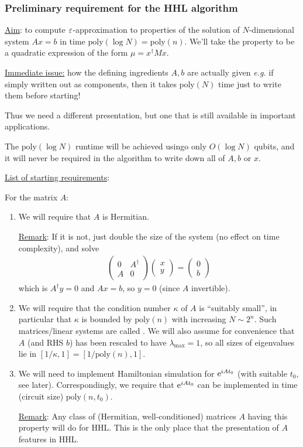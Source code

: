\documentclass[]{article}
\renewcommand{\it}[1]{\textit{#1}}
\newcommand{\poly}{\textrm{poly}}
\begin{document}
\subsubsection*{Preliminary requirement for the HHL algorithm}

\underline{Aim}: to compute $\varepsilon$-approximation to properties of the solution of $N$-dimensional system $Ax = b$ in time $\poly(\log N) = \poly(n)$. We'll take the property to be a quadratic expression of the form $\mu = x^\dagger M x$.

\underline{Immediate issue:} how the defining ingredients $A,b$ are actually given \it{e.g.} if simply written out as components, then it takes $\poly(N)$ time just to write them before starting!

Thus we need a different presentation, but one that is still available in important applications.

The $\poly(\log N)$ runtime will be achieved usingo only $O(\log N)$ qubits, and it will never be required in the algorithm to write down all of $A,b$ or $x$.

\underline{List of starting requirements}:

For the matrix $A$:

\begin{enumerate}
	\item We will require that $A$ is Hermitian.
	
	\underline{Remark}: If it is not, just double the size of the system (no effect on time complexity), and solve
	\begin{align*}
		\left( \begin{array}{cc} 0 & A^\dagger \\ A & 0 \end{array}\right)\left(\begin{array}{c} x \\ y \end{array}\right) = \left( \begin{array}{c}0 \\ b \end{array}\right)
	\end{align*}
	which is $A^\dagger y = 0$ and $Ax = b$, so $y = 0$ (since $A$ invertible).

	\item We will require that the condition number $\kappa$ of $A$ is ``suitably small'', in particular that $\kappa$ is bounded by $\poly(n)$ with increasing $N\sim 2^n$. Such matrices/linear systems are called . We will also assume for convenience that $A$ (and RHS $b$) has been rescaled to have $\lambda_{\max} = 1$, so all sizes of eigenvalues lie in $[1/\kappa,1] = [1/\poly(n),1]$.
	
	\item We will need to implement Hamiltonian simulation for $\mathrm{e}^{iAt_0}$ (with suitable $t_0$, see later). Correspondingly, we require that $\mathrm{e}^{iAt_0}$ can be implemented in time (circuit size) $\poly(n,t_0)$.
	
	\underline{Remark}: Any class of (Hermitian, well-conditioned) matrices $A$ having this property will do for HHL. This is the only place that the presentation of $A$ features in HHL.
\end{enumerate}
\end{document}
